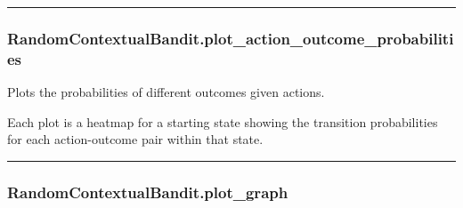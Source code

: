 \begin{Shaded}
\begin{Highlighting}[]
\OperatorTok{=}
\end{Highlighting}
\end{Shaded}

\begin{center}\rule{0.5\linewidth}{\linethickness}\end{center}

\subsubsection{RandomContextualBandit.plot\_action\_outcome\_probabilities}\label{randomcontextualbandit.plot_action_outcome_probabilities}

\begin{Shaded}
\begin{Highlighting}[]
\OperatorTok{=}\OperatorTok{=}\OperatorTok{=}\OperatorTok{=}\NormalTok{)}
\end{Highlighting}
\end{Shaded}

Plots the probabilities of different outcomes given actions.

Each plot is a heatmap for a starting state showing the transition
probabilities for each action-outcome pair within that state.

\begin{center}\rule{0.5\linewidth}{\linethickness}\end{center}

\subsubsection{RandomContextualBandit.plot\_graph}\label{randomcontextualbandit.plot_graph}

\begin{Shaded}
\begin{Highlighting}[]
\OperatorTok{=}\OperatorTok{=}\OperatorTok{=}\OperatorTok{=}\OperatorTok{=}\OperatorTok{=}\OperatorTok{=}\OperatorTok{=}\NormalTok{)}
\end{Highlighting}
\end{Shaded}


